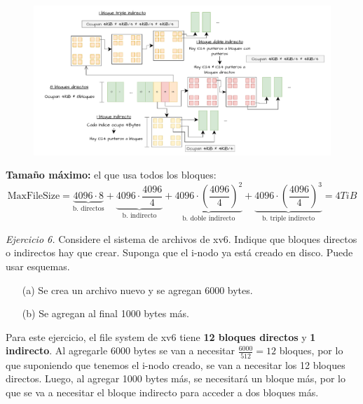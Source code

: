 \documentclass[12pt]{article}
\begin{document}
\begin{figure}[h]
    \centering
    \includegraphics[width=1\textwidth]{ej5.pdf}
\end{figure}

\newpage
\begin{rta}
    \textbf{Tamaño máximo:} el que usa todos los bloques:
    \begin{equation*}
        \text{MaxFileSize} = \underbrace{4096 \cdot 8}_{\text{b. directos}} + \underbrace{4096 \cdot \frac{4096}{4}}_{\text{b. indirecto}} + \underbrace{4096 \cdot \left(\frac{4096}{4}\right)^2}_{\text{b. doble indirecto}} + \underbrace{4096 \cdot \left(\frac{4096}{4}\right)^3}_{\text{b. triple indirecto}} = 4TiB
    \end{equation*}
\end{rta}

\noindent \textit{Ejercicio 6.} Considere el sistema de archivos de xv6. \newline Indique que bloques directos o indirectos hay que crear. Suponga que el i-nodo ya está creado en disco. Puede usar esquemas.

\begin{itemize}
    \item[(a)] Se crea un archivo nuevo y se agregan 6000 bytes.
    \item[(b)] Se agregan al final 1000 bytes más.
\end{itemize}


\begin{rta}
    Para este ejercicio, el file system de xv6 tiene \textbf{12 bloques directos} y \textbf{1 indirecto}. Al agregarle 6000 bytes se van a necesitar $\frac{6000}{512} = 12$ bloques, por lo que suponiendo que tenemos el i-nodo creado, se van a necesitar los 12 bloques directos. Luego, al agregar 1000 bytes más, se necesitará un bloque más, por lo que se va a necesitar el bloque indirecto para acceder a dos bloques más.
\end{rta}
\end{document}

